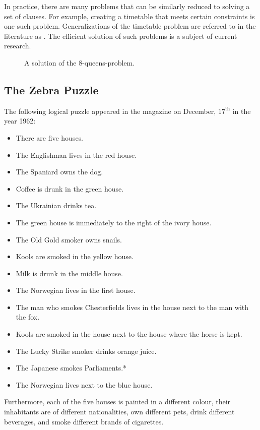 In practice, there are many problems that can be similarly reduced to solving a
set of clauses. For example, creating a timetable that meets certain constraints is one such problem. Generalizations of the
timetable problem are referred to in the literature as .
The efficient solution of such problems is a subject of current research.

\begin{figure}[!ht]
  \centering
  \caption{A solution of the 8-queens-problem.}
  \label{fig:8-queens.pdf}
\end{figure}
\FloatBarrier


\subsection{The Zebra Puzzle} 
The following logical puzzle appeared in the magazine 
on  December, $17^\textrm{th}$  in the year 1962:
\begin{itemize}
\item There are five houses.
\item The Englishman lives in the red house.
\item The Spaniard owns the dog.
\item Coffee is drunk in the green house.
\item The Ukrainian drinks tea.
\item The green house is immediately to the right of the ivory house.
\item The Old Gold smoker owns snails.
\item Kools are smoked in the yellow house.
\item Milk is drunk in the middle house.
\item The Norwegian lives in the first house.
\item The man who smokes Chesterfields lives in the house next to the man with the fox.
\item Kools are smoked in the house next to the house where the horse is kept.
\item The Lucky Strike smoker drinks orange juice.
\item The Japanese smokes Parliaments.*
\item The Norwegian lives next to the blue house.
\end{itemize}
Furthermore, each of the five houses is painted in a different colour, their
inhabitants are of different nationalities, own different pets, drink different
beverages, and smoke different brands of cigarettes.  


